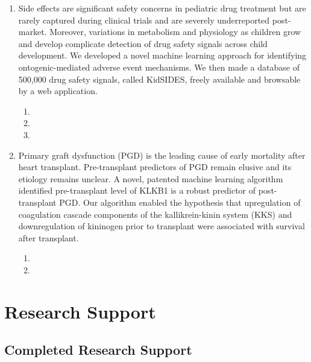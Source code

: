 \documentclass{nihbiosketch}
\begin{document}
\begin{enumerate}

\item Side effects are significant safety concerns in pediatric drug treatment but are rarely captured during clinical trials and are severely underreported post-market. Moreover, variations in metabolism and physiology as children grow and develop complicate detection of drug safety signals across child development. We developed a novel machine learning approach for identifying ontogenic-mediated adverse event mechanisms. We then made a database of 500,000 drug safety signals, called KidSIDES, freely available and browsable by a web application.

\begin{enumerate}
  \item {}
  \item {}
  \item {}
\end{enumerate}


\item Primary graft dysfunction (PGD) is the leading cause of early mortality after heart transplant. Pre-transplant predictors of PGD remain elusive and its etiology remains unclear. A novel, patented machine learning algorithm identified pre-transplant level of KLKB1 is a robust predictor of post-transplant PGD. Our algorithm enabled the hypothesis that upregulation of coagulation cascade components of the kallikrein-kinin system (KKS) and downregulation of kininogen prior to transplant were associated with survival after transplant.

\begin{enumerate}
  \item {}
  \item {}
\end{enumerate}

\end{enumerate}



 

  \section{Research Support}
  
      
  
    \subsection*{Completed Research Support}
  
\end{document}
